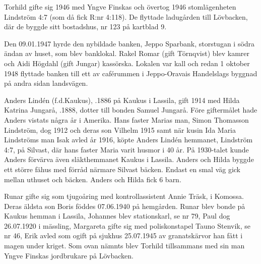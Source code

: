 Torhild gifte sig 1946 med Yngve Finskas och övertog 1946 stomlägenheten Lindström 4:7 (som då fick R:nr 4:118). De flyttade ladugården till Lövbacken, där de byggde sitt bostadshus, nr 123 på kartblad 9.

Den 09.01.1947 hyrde den nybildade banken, Jeppo Sparbank, storstugan i södra ändan av huset, som blev banklokal. Rakel Romar (gift Törnqvist) blev kamrer och Aidi Högdahl (gift Jungar) kassörska. Lokalen var kall och redan 1 oktober 1948 flyttade banken till ett av caférummen i Jeppo-Oravais Handelslags byggnad på andra sidan landsvägen.


%
Anders Lindén (f.d.Kaukus), .1886 på Kaukus i Lassila, gift 1914	med Hilda Katrina Jungarå, .1888, dotter till bonden Samuel Jungarå. Före giftermålet hade Anders vistats några år i Amerika. Hans faster Marias man, Simon Thomasson Lindström, dog 1912 och deras son Vilhelm 1915 samt när kusin Ida Maria Lindströms man Isak avled år 1916, köpte Anders Lindén hemmanet, Lindström 4:7, på Silvast, där hans faster Maria varit husmor i 40 år. På 1930-talet kunde Anders förvärva även släkthemmanet Kaukus i Lassila. Anders och Hilda byggde ett större fähus med förråd närmare Silvast bäcken. Endast en smal väg gick mellan uthuset och bäcken. Anders och Hilda fick 6 barn.
\begin{jhchildren}
  \item {}
  \item {}
  \item {}
  \item {}
  \item {}
  \item {}
\end{jhchildren}
Runar gifte sig som tjugoåring med kontrollassistent Annie Träsk,  i Komossa. Deras äldsta son Boris föddes 07.06.1940 på hemgården. Runar blev bonde på Kaukus hemman i Lassila, Johannes blev stationskarl, se nr 79, Paul dog 26.07.1920 i mässling, Margareta gifte sig med poliskonstapel Tauno Stenvik, se nr 46, Erik avled som ogift på sjukhus 25.07.1945 av granatskärvor han fått i magen under kriget. Som ovan nämnts blev Torhild tillsammans med sin man Yngve Finskas jordbrukare på Lövbacken.

